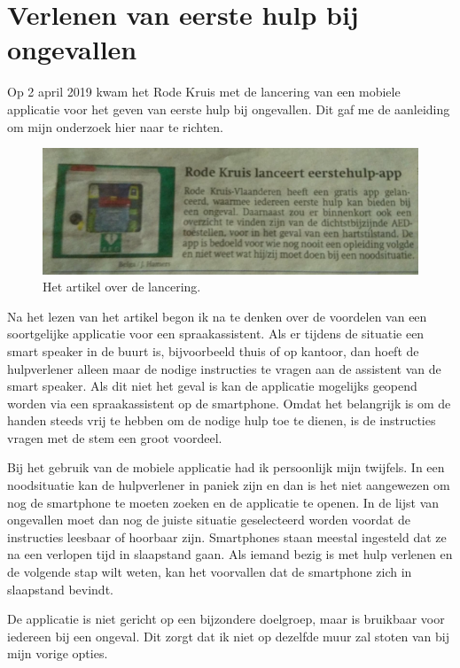 \section{Verlenen van eerste hulp bij ongevallen}
Op 2 april 2019 kwam het Rode Kruis met de lancering van een mobiele applicatie voor het geven van eerste hulp bij ongevallen. Dit gaf me de aanleiding om mijn onderzoek hier naar te richten.

\begin{figure}[h]
    \centering
    \includegraphics[width=0.8\linewidth]{img/artikelRodeKruisApp}
    \caption{Het artikel over de lancering. \autocite{Hamers2019}}
    \label{fig:artikel-ehboapp}
\end{figure}

Na het lezen van het artikel begon ik na te denken over de voordelen van een soortgelijke applicatie voor een spraakassistent. Als er tijdens de situatie een smart speaker in de buurt is, bijvoorbeeld thuis of op kantoor, dan hoeft de hulpverlener alleen maar de nodige instructies te vragen aan de assistent van de smart speaker. Als dit niet het geval is kan de applicatie mogelijks geopend worden via een spraakassistent op de smartphone. Omdat het belangrijk is om de handen steeds vrij te hebben om de nodige hulp toe te dienen, is de instructies vragen met de stem een groot voordeel.

Bij het gebruik van de mobiele applicatie had ik persoonlijk mijn twijfels. In een noodsituatie kan de hulpverlener in paniek zijn en dan is het niet aangewezen om nog de smartphone te moeten zoeken en de applicatie te openen. In de lijst van ongevallen moet dan nog de juiste situatie geselecteerd worden voordat de instructies leesbaar of hoorbaar zijn. Smartphones staan meestal ingesteld dat ze na een verlopen tijd in slaapstand gaan. Als iemand bezig is met hulp verlenen en de volgende stap wilt weten, kan het voorvallen dat de smartphone zich in slaapstand bevindt.

De applicatie is niet gericht op een bijzondere doelgroep, maar is bruikbaar voor iedereen bij een ongeval. Dit zorgt dat ik niet op dezelfde muur zal stoten van bij mijn vorige opties.